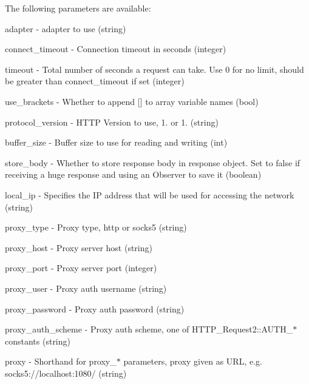 The following parameters are available\+: 
\begin{DoxyItemize}
\item \textquotesingle{}adapter\textquotesingle{} -\/ adapter to use (string) 
\item \textquotesingle{}connect\+\_\+timeout\textquotesingle{} -\/ Connection timeout in seconds (integer) 
\item \textquotesingle{}timeout\textquotesingle{} -\/ Total number of seconds a request can take. Use 0 for no limit, should be greater than \textquotesingle{}connect\+\_\+timeout\textquotesingle{} if set (integer) 
\item \textquotesingle{}use\+\_\+brackets\textquotesingle{} -\/ Whether to append \mbox{[}\mbox{]} to array variable names (bool) 
\item \textquotesingle{}protocol\+\_\+version\textquotesingle{} -\/ H\+T\+T\+P Version to use, \textquotesingle{}1.\textquotesingle{} or \textquotesingle{}1.\textquotesingle{} (string) 
\item \textquotesingle{}buffer\+\_\+size\textquotesingle{} -\/ Buffer size to use for reading and writing (int) 
\item \textquotesingle{}store\+\_\+body\textquotesingle{} -\/ Whether to store response body in response object. Set to false if receiving a huge response and using an Observer to save it (boolean) 
\item \textquotesingle{}local\+\_\+ip\textquotesingle{} -\/ Specifies the I\+P address that will be used for accessing the network (string) 
\item \textquotesingle{}proxy\+\_\+type\textquotesingle{} -\/ Proxy type, \textquotesingle{}http\textquotesingle{} or \textquotesingle{}socks5\textquotesingle{} (string) 
\item \textquotesingle{}proxy\+\_\+host\textquotesingle{} -\/ Proxy server host (string) 
\item \textquotesingle{}proxy\+\_\+port\textquotesingle{} -\/ Proxy server port (integer) 
\item \textquotesingle{}proxy\+\_\+user\textquotesingle{} -\/ Proxy auth username (string) 
\item \textquotesingle{}proxy\+\_\+password\textquotesingle{} -\/ Proxy auth password (string) 
\item \textquotesingle{}proxy\+\_\+auth\+\_\+scheme\textquotesingle{} -\/ Proxy auth scheme, one of H\+T\+T\+P\+\_\+\+Request2\+::\+A\+U\+T\+H\+\_\+$\ast$ constants (string) 
\item \textquotesingle{}proxy\textquotesingle{} -\/ Shorthand for proxy\+\_\+$\ast$ parameters, proxy given as U\+R\+L, e.\+g. \textquotesingle{}socks5\+://localhost\+:1080/\textquotesingle{} (string) 

\end{DoxyItemize}
